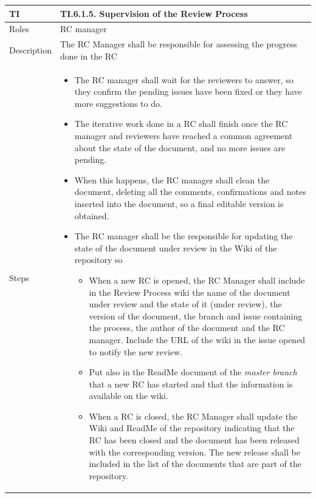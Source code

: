 \documentclass{template/openetcs_article}
\begin{document}
\begin{flushleft}
\tablefirsthead{}
\tablehead{}
\tabletail{}
\tablelasttail{}
\begin{supertabular}{|m{2cm}|m{13cm}|}
\hline
{}
TI & 
TI.6.1.5. Supervision of the Review Process
\\\hline
Roles &
RC manager
\\\hline
Description &
The RC Manager shall be responsible for assessing the progress done in the RC
\\\hline
Steps &
\begin{itemize}
\item The RC manager shall wait for the reviewers to answer, so they confirm the pending issues have been fixed or they have more suggestions to do.
\item The iterative work done in a RC shall finish once the RC manager and reviewers have reached a common agreement about the state of the document, and no more issues are pending. \item When this happens, the RC manager shall clean the document, deleting all the comments, confirmations and notes inserted into the document, so a final editable version is obtained.
\item The RC manager shall be the responsible for updating the state of the document under review in the Wiki of the repository so
\begin{itemize}
\item When a new RC is opened, the RC Manager shall include in the Review Process wiki the name of the document under review and the state of it (under review), the version of the document, the branch and issue containing the process, the author of the document and the RC manager. Include the URL of the wiki in the issue opened to notify the new review.
\item Put also in the ReadMe document of the {\it master branch} that a new RC has started and that the information is available on the wiki.
\item When a RC is closed, the RC Manager shall update the Wiki and ReadMe of the repository indicating that the RC has been closed and the document has been released with the corresponding version. The new release shall be included in the list of the documents that are part of the repository.
\end{itemize}
\end{itemize}
\\\hline
\end{supertabular}
\end{flushleft}
\end{document}
